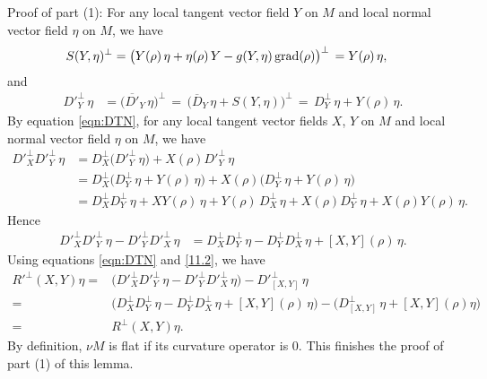 \documentclass[12pt]{article}
\begin{document}
\vspace{6pt}
\noindent
{Proof of part (1)}:
For any local tangent vector field  $Y$ on $M$ and local normal vector field $\eta$ on $M$, we have
\begin{align} \label{eqn:STN}
	S(Y,\eta)^{\perp}&= \big( Y(\rho) \, \eta + \eta(\rho) \, Y - g(Y,\eta) \, {\rm grad}(\rho) \big)^{\perp} \,
	 =Y(\rho) \, \eta,
\end{align}
and
\begin{align} \label{eqn:DTN}
	D'^{\perp}_{Y} \, \eta
	&=\big( \overline{D'}_{Y} \, \eta \big)^{\perp}
	\, = \, \big( \overline{D}_{Y} \, \eta + S(Y,\eta) \big)^{\perp}
	\, = \, D^{\perp}_{Y} \, \eta + Y(\rho) \, \eta.
\end{align}
By equation \eqref{eqn:DTN}, for any local tangent vector fields $X$, $Y$ on $M$ and local normal vector field $\eta$
on $M$, we have
\begin{align}
	D'^{\perp}_{X} D'^{\perp}_{Y} \, \eta
	&=D^{\perp}_X \big( D'^{\perp}_{Y} \, \eta \big)
           + X(\rho)  D'^{\perp}_{Y} \, \eta \nonumber \\
	&=D^{\perp}_X \big( D^{\perp}_Y \, \eta + Y(\rho) \, \eta \big)
           + X(\rho) \big( D^{\perp}_Y \, \eta + Y(\rho) \, \eta \big)\nonumber \\
	&=D^{\perp}_X D^{\perp}_Y \, \eta +
             X Y(\rho) \, \eta + Y(\rho) \, D^{\perp}_X \, \eta
             + X(\rho) D^{\perp}_Y \, \eta + X(\rho) Y(\rho) \, \eta. \nonumber
\end{align}
Hence
\begin{align}
	D'^{\perp}_{X} D'^{\perp}_{Y} \, \eta - D'^{\perp}_{Y} D'^{\perp}_{X} \, \eta
	&=D^{\perp}_X D^{\perp}_Y \, \eta - D^{\perp}_Y D^{\perp}_X \, \eta
             + [X, Y](\rho) \, \eta  . \label{11.2}
\end{align}
Using equations \eqref{eqn:DTN} and \eqref{11.2}, we have
\begin{align*}
	R'^{\perp}(X,Y) \eta
    =& \big( D'^{\perp}_{X} D'^{\perp}_{Y} \, \eta - D'^{\perp}_{Y} D'^{\perp}_{X} \, \eta \big)
            - D'^{\perp}_{[X,Y]} \, \eta \\
	=& \big( D^{\perp}_X D^{\perp}_Y \, \eta - D^{\perp}_Y D^{\perp}_X \, \eta
             + [X, Y](\rho) \, \eta  \big)
	    -\big( D^{\perp}_{[X,Y]} \, \eta + [X,Y](\rho) \eta \big)\\
	=& R^{\perp}(X,Y)\eta.
\end{align*}
By definition, $\nu M$ is flat if its curvature operator is $0$. This finishes the proof of part (1)
of this lemma.
\end{document}
